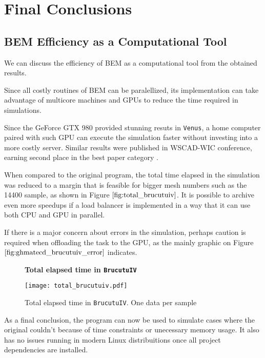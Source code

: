\chapter{Final Conclusions}
\label{cap:conclusoes}

\section{BEM Efficiency as a Computational Tool}

We can discuss the efficiency of BEM as a computational tool from the obtained results.

Since all costly routines of BEM can be paralellized, its implementation can take advantage 
of multicore machines and GPUs to reduce the time required in simulations.

Since the GeForce GTX 980 provided stunning resuts in \texttt{Venus}, a home computer paired 
with such GPU can execute the simulation faster without investing into a more costly server. 
Similar results were published in WSCAD-WIC conference, earning second place in the best paper 
category \citep{belinassi:2017}.


When compared to the original program, the total time elapsed in the simulation was reduced to a 
margin that is feasible for bigger mesh numbers such as the 14400 sample, as shown in
Figure $\ref{fig:total_brucutuiv}$. It is possible to archive even more speedups if a load balancer 
is implemented in a way that it can use both CPU and GPU in parallel.

If there is a major concern about errors in the simulation, perhaps caution is required when offloading 
the task to the GPU, as the mainly graphic on Figure $\ref{fig:ghmatecd_brucutuiv_error}$ indicates.

\begin{figure}[ht]
\centering
\textbf{Total elapsed time in \texttt{BrucutuIV}}\par\medskip
\texttt{[image: total\_brucutuiv.pdf]}
\caption{Total elapsed time in \texttt{BrucutuIV}. One data per sample}
\label{fig:total_brucutuiv}
\end{figure}

As a final conclusion, the program can now be used to simulate cases where the original couldn't 
because of time constraints or unecessary memory usage. It also has no issues running in modern 
Linux distribuitions once all project dependencies are installed.

